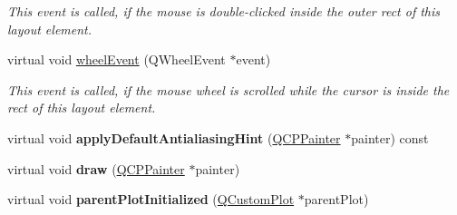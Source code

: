 \begin{DoxyCompactItemize}
\begin{DoxyCompactList}\small\item\em This event is called, if the mouse is double-\/clicked inside the outer rect of this layout element. \end{DoxyCompactList}\item 
\hypertarget{classQCPLayoutElement_a300521d2fd18a893c1b85f6be11ce2bf}{}virtual void \hyperlink{classQCPLayoutElement_a300521d2fd18a893c1b85f6be11ce2bf}{wheel\+Event} (Q\+Wheel\+Event $\ast$event)\label{classQCPLayoutElement_a300521d2fd18a893c1b85f6be11ce2bf}

\begin{DoxyCompactList}\small\item\em This event is called, if the mouse wheel is scrolled while the cursor is inside the rect of this layout element. \end{DoxyCompactList}\item 
\hypertarget{classQCPLayoutElement_ad6d2b4bb0291c2441b2e1ca3d5296df5}{}virtual void {\bfseries apply\+Default\+Antialiasing\+Hint} (\hyperlink{classQCPPainter}{Q\+C\+P\+Painter} $\ast$painter) const \label{classQCPLayoutElement_ad6d2b4bb0291c2441b2e1ca3d5296df5}

\item 
\hypertarget{classQCPLayoutElement_a547bcc1e6e2be5645ca781efe0834653}{}virtual void {\bfseries draw} (\hyperlink{classQCPPainter}{Q\+C\+P\+Painter} $\ast$painter)\label{classQCPLayoutElement_a547bcc1e6e2be5645ca781efe0834653}

\item 
\hypertarget{classQCPLayoutElement_a1478899e80e8244b411e96ec3b2e5ce2}{}virtual void {\bfseries parent\+Plot\+Initialized} (\hyperlink{classQCustomPlot}{Q\+Custom\+Plot} $\ast$parent\+Plot)\label{classQCPLayoutElement_a1478899e80e8244b411e96ec3b2e5ce2}

\end{DoxyCompactItemize}
